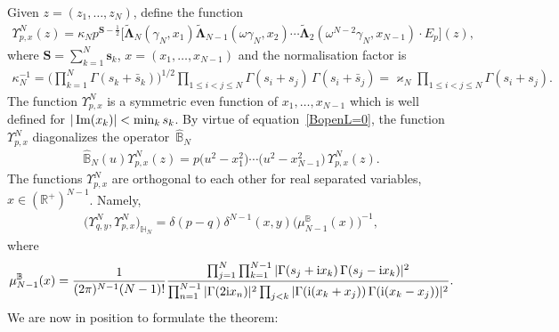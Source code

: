 \documentclass[pdftex]{sigma}%
\numberwithin{equation}{section}
\begin{document}
Given $ z=(z_1,\dots, z_{N})$, define the function
\begin{gather*}%
\Upsilon^N_{p,{x}}( z) = \kappa_N p^{\boldsymbol S-\frac12}
 \Big[ \widetilde{\boldsymbol\Lambda}_N(\gamma_N, x_1)
 \widetilde{\boldsymbol\Lambda}_{N-1}(\omega\gamma_N, x_2)\cdots \widetilde{\boldsymbol\Lambda}_2(\omega^{N-2}\gamma_N, x_{N-1})
 \cdot E_p \Big]( z),
\end{gather*}
where $\boldsymbol S=\sum_{k=1}^N \boldsymbol s_k$, $x=(x_1,\dots,x_{N-1})$ and the normalisation factor is
\begin{gather*}
\kappa_N^{-1}=\bigg(\prod_{k=1}^N\Gamma(s_k+\bar s_k)\bigg)^{1/2} \prod_{1\leq i<j\leq N}\Gamma(s_i+s_j)\,\Gamma(s_i+\bar s_j)=
\varkappa_N \prod_{1\leq i<j\leq N}\Gamma(s_i+s_j).
\end{gather*}
The function $\Upsilon^N_{p, x}$ is a symmetric even function of $x_1,\dots,x_{N-1}$
which is well defined for $|\mathop{\rm Im}(x_k)|\allowbreak <\min_k s_k$.
By virtue of equation~\eqref{BopenL=0}, the function $\Upsilon^N_{p,{x}}$ diagonalizes the operator~$\widehat{\mathbb B}_N$
\begin{gather*}
\widehat{\mathbb B}_N(u)\Upsilon^N_{p,{x}}( z) = p
\big(u^2-x_1^2\big)\cdots \big(u^2-x_{N-1}^2\big)\,\Upsilon^N_{p,{x}}( z).
\end{gather*}
The functions $\Upsilon^N_{p, x}$ are orthogonal to each other for real separated variables, $ x \in (\mathbb{R}^+)^{N-1}$. Namely,
\begin{gather*}
\big(\Upsilon^N_{q,{y}},\Upsilon^N_{p,{x}}\big)_{\mathbb H_N} =
 \delta(p-q)\delta^{N-1}( x,y) \big(\mu_{N-1}^{\mathbb B}( x)\big)^{-1},
\end{gather*}
where
\begin{gather*}%
\mu_{N-1}^{\mathbb B}(x)=\frac1{(2\pi)^{N-1}(N-1)!}
\frac {\prod_{j=1}^N\prod_{k=1}^{N-1}|\Gamma(s_j +{\rm i}x_k)\,\Gamma(s_j -{\rm i}x_k)|^{2}}
{\prod_{n=1}^{N-1}|\Gamma(2{\rm i}x_n)|^2\prod_{j< k}
|\Gamma({\rm i}(x_k + x_j))\,\Gamma({\rm i}(x_k - x_j))|^2 }.
\end{gather*}
We are now in position to formulate the theorem:
\end{document}
